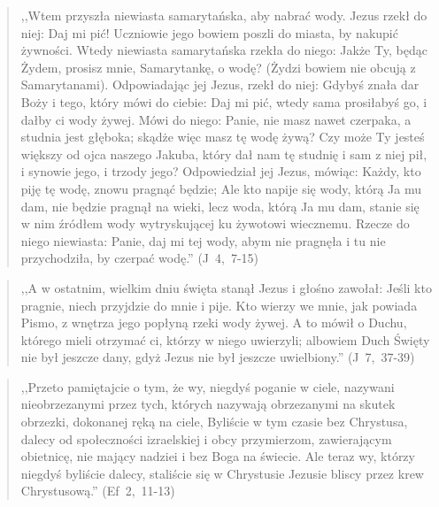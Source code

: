 \documentclass[10pt,a4paper,oneside]{article}
\begin{document}
\begin{quote}
,,Wtem przyszła niewiasta samarytańska, aby nabrać wody. Jezus rzekł do niej: Daj mi pić! Uczniowie jego bowiem poszli do miasta, by nakupić żywności. Wtedy niewiasta samarytańska rzekła do niego: Jakże Ty, będąc Żydem, prosisz mnie, Samarytankę, o wodę? (Żydzi bowiem nie obcują z Samarytanami). Odpowiadając jej Jezus, rzekł do niej: Gdybyś znała dar Boży i tego, który mówi do ciebie: Daj mi pić, wtedy sama prosiłabyś go, i dałby ci wody żywej. Mówi do niego: Panie, nie masz nawet czerpaka, a studnia jest głęboka; skądże więc masz tę wodę żywą? Czy może Ty jesteś większy od ojca naszego Jakuba, który dał nam tę studnię i sam z niej pił, i synowie jego, i trzody jego? Odpowiedział jej Jezus, mówiąc: Każdy, kto piję tę wodę, znowu pragnąć będzie; Ale kto napije się wody, którą Ja mu dam, nie będzie pragnął na wieki, lecz woda, którą Ja mu dam, stanie się w nim źródłem wody wytryskującej ku żywotowi wiecznemu. Rzecze do niego niewiasta: Panie, daj mi tej wody, abym nie pragnęła i tu nie przychodziła, by czerpać wodę.'' \mbox{(J 4, 7-15)}
\end{quote}
\begin{quote}
,,A w ostatnim, wielkim dniu święta stanął Jezus i głośno zawołał: Jeśli kto pragnie, niech przyjdzie do mnie i pije. Kto wierzy we mnie, jak powiada Pismo, z wnętrza jego popłyną rzeki wody żywej. A to mówił o Duchu, którego mieli otrzymać ci, którzy w niego uwierzyli; albowiem Duch Święty nie był jeszcze dany, gdyż Jezus nie był jeszcze uwielbiony.'' \mbox{(J 7, 37-39)}
\end{quote}
\begin{quote}
,,Przeto pamiętajcie o tym, że wy, niegdyś poganie w ciele, nazywani nieobrzezanymi przez tych, których nazywają obrzezanymi na skutek obrzezki, dokonanej ręką na ciele, Byliście w tym czasie bez Chrystusa, dalecy od społeczności izraelskiej i obcy przymierzom, zawierającym obietnicę, nie mający nadziei i bez Boga na świecie. Ale teraz wy, którzy niegdyś byliście dalecy, staliście się w Chrystusie Jezusie bliscy przez krew Chrystusową.'' \mbox{(Ef 2, 11-13)}
\end{quote}
\end{document}
